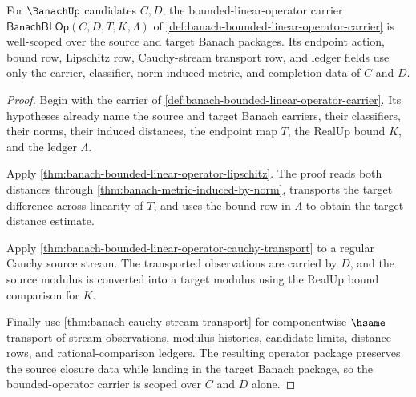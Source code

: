 \begin{theorem}
\label{thm:banach-bounded-operator-source-closure}
For $\BanachUp$ candidates $C,D$, the bounded-linear-operator carrier
$\mathsf{BanachBLOp}(C,D,T,K,\Lambda)$ of
\autoref{def:banach-bounded-linear-operator-carrier} is well-scoped over the
source and target Banach packages. Its endpoint action, bound row, Lipschitz
row, Cauchy-stream transport row, and ledger fields use only the carrier,
classifier, norm-induced metric, and completion data of $C$ and $D$.
\end{theorem}
\begin{proof}
Begin with the carrier of
\autoref{def:banach-bounded-linear-operator-carrier}. Its hypotheses already
name the source and target Banach carriers, their classifiers, their norms,
their induced distances, the endpoint map $T$, the RealUp bound $K$, and the
ledger $\Lambda$.

Apply \autoref{thm:banach-bounded-linear-operator-lipschitz}. The proof reads
both distances through \autoref{thm:banach-metric-induced-by-norm}, transports
the target difference across linearity of $T$, and uses the bound row in
$\Lambda$ to obtain the target distance estimate.

Apply \autoref{thm:banach-bounded-linear-operator-cauchy-transport} to a
regular Cauchy source stream. The transported observations are carried by
$D$, and the source modulus is converted into a target modulus using the
RealUp bound comparison for $K$.

Finally use \autoref{thm:banach-cauchy-stream-transport} for componentwise
$\hsame$ transport of stream observations, modulus histories, candidate
limits, distance rows, and rational-comparison ledgers. The resulting
operator package preserves the source closure data while landing in the
target Banach package, so the bounded-operator carrier is scoped over $C$ and
$D$ alone.
\end{proof}

